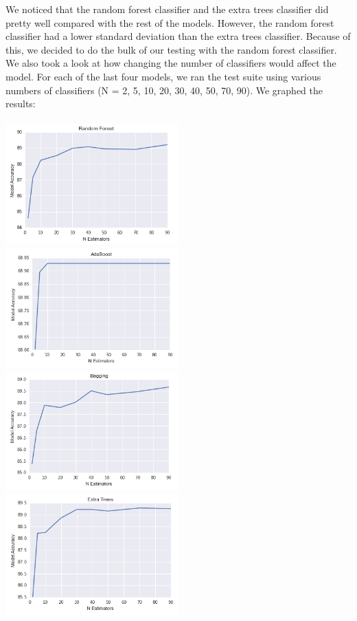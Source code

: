 \documentclass[12pt]{article}
\begin{document}
We noticed that the random forest classifier and the extra trees classifier did pretty well compared with the rest of the models. However, the random forest classifier had a lower standard deviation than the extra trees classifier. Because of this, we decided to do the bulk of our testing with the random forest classifier. \\

We also took a look at how changing the number of classifiers would affect the model. For each of the last four models, we ran the test suite using various numbers of classifiers (N = 2, 5, 10, 20, 30, 40, 50, 70, 90). We graphed the results: \\\\

\includegraphics[width=0.5\textwidth]{img/RandomForest.png}
\includegraphics[width=0.5\textwidth]{img/AdaBoost.png} \\
\includegraphics[width=0.5\textwidth]{img/Bagging.png}
\includegraphics[width=0.5\textwidth]{img/ExtraTrees.png} \\
\end{document}
